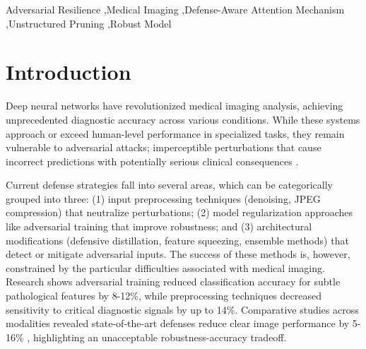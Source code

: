 \documentclass[preprint,12pt]{elsarticle}
\begin{document}
\begin{frontmatter}
\begin{keyword}
Adversarial Resilience \sep Medical Imaging \sep Defense-Aware Attention Mechanism \sep Unstructured Pruning \sep Robust Model


\end{keyword}

\end{frontmatter}



\section{Introduction}
\label{sec:introduction}

Deep neural networks have revolutionized medical imaging analysis, achieving unprecedented diagnostic accuracy across various conditions\cite{Mamo24}. While these systems approach or exceed human-level performance in specialized tasks, they remain vulnerable to adversarial attacks; imperceptible perturbations that cause incorrect predictions with potentially serious clinical consequences \cite{Bortsova21, Kaviani22}.

Current defense strategies fall into several areas, which can be categorically grouped into three: (1) input preprocessing techniques (denoising\cite{Chiang20}, JPEG compression\cite{Cheng21}) that neutralize perturbations; (2) model regularization approaches like adversarial training\cite{Muoka23} that improve robustness; and (3) architectural modifications (defensive distillation\cite{Qi24}, feature squeezing\cite{vasan2024}, ensemble methods\cite{Alzubaidi24}) that detect or mitigate adversarial inputs. The success of these methods is, however, constrained by the particular difficulties associated with medical imaging. Research shows adversarial training reduced classification accuracy for subtle pathological features by 8-12\%\cite{Sriramanan21}, while preprocessing techniques decreased sensitivity to critical diagnostic signals by up to 14\%\cite{Suganyadevi22}. Comparative studies across modalities revealed state-of-the-art defenses reduce clear image performance by 5-16\% \cite{Rodriguez22}, highlighting an unacceptable robustness-accuracy tradeoff.
\end{document}
